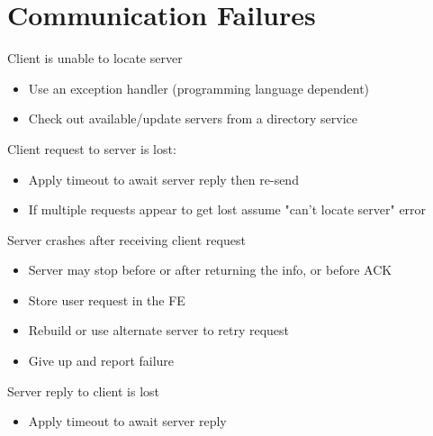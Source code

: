 \documentclass{article}[18pt]
\begin{document}
\section{Communication Failures}
Client is unable to locate server
\begin{itemize}
	\item Use an exception handler (programming language dependent)
	\item Check out available/update servers from a directory service
\end{itemize}
Client request to server is lost:
\begin{itemize}
	\item Apply timeout to await server reply then re-send
	\item If multiple requests appear to get lost assume "can't locate server" error
\end{itemize}
Server crashes after receiving client request
\begin{itemize}
	\item Server may stop before or after returning the info, or before ACK
	\item Store user request in the FE
	\item Rebuild or use alternate server to retry request
	\item Give up and report failure
\end{itemize}
Server reply to client is lost
\begin{itemize}
	\item Apply timeout to await server reply
\end{itemize}
\end{document}
